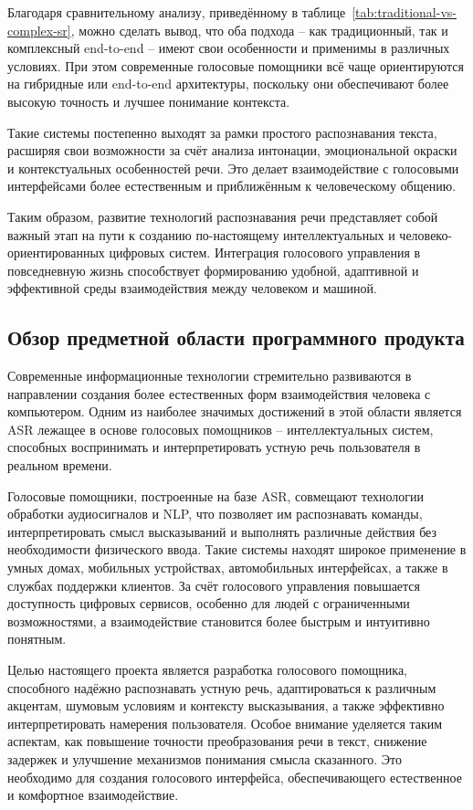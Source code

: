 Благодаря сравнительному анализу, приведённому в таблице~\ref{tab:traditional-vs-complex-sr}, можно сделать вывод, что оба подхода -- как традиционный, так и комплексный end-to-end -- имеют свои особенности и применимы в различных условиях. При этом современные голосовые помощники всё чаще ориентируются на гибридные или end-to-end архитектуры, поскольку они обеспечивают более высокую точность и лучшее понимание контекста.

Такие системы постепенно выходят за рамки простого распознавания текста, расширяя свои возможности за счёт анализа интонации, эмоциональной окраски и контекстуальных особенностей речи. Это делает взаимодействие с голосовыми интерфейсами более естественным и приближённым к человеческому общению.

Таким образом, развитие технологий распознавания речи представляет собой важный этап на пути к созданию по-настоящему интеллектуальных и человеко-ориентированных цифровых систем. Интеграция голосового управления в повседневную жизнь способствует формированию удобной, адаптивной и эффективной среды взаимодействия между человеком и машиной.

\subsection{Обзор предметной области программного продукта}

Современные информационные технологии стремительно развиваются в направлении создания более естественных форм взаимодействия человека с компьютером. Одним из наиболее значимых достижений в этой области является ASR лежащее в основе голосовых помощников -- интеллектуальных систем, способных воспринимать и интерпретировать устную речь пользователя в реальном времени.

Голосовые помощники, построенные на базе ASR, совмещают технологии обработки аудиосигналов и NLP, что позволяет им распознавать команды, интерпретировать смысл высказываний и выполнять различные действия без необходимости физического ввода. Такие системы находят широкое применение в умных домах, мобильных устройствах, автомобильных интерфейсах, а также в службах поддержки клиентов. За счёт голосового управления повышается доступность цифровых сервисов, особенно для людей с ограниченными возможностями, а взаимодействие становится более быстрым и интуитивно понятным.

Целью настоящего проекта является разработка голосового помощника, способного надёжно распознавать устную речь, адаптироваться к различным акцентам, шумовым условиям и контексту высказывания, а также эффективно интерпретировать намерения пользователя. Особое внимание уделяется таким аспектам, как повышение точности преобразования речи в текст, снижение задержек и улучшение механизмов понимания смысла сказанного. Это необходимо для создания голосового интерфейса, обеспечивающего естественное и комфортное взаимодействие.

